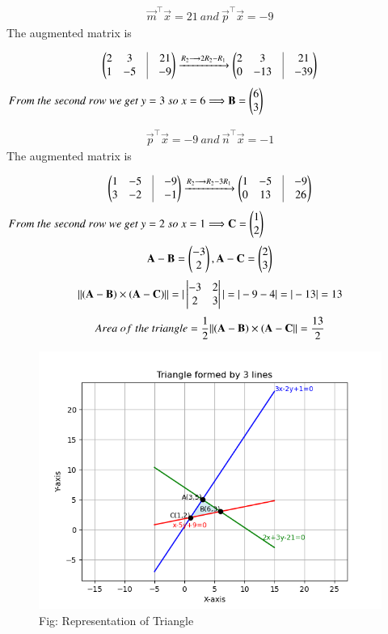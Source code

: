 \documentclass[journal]{IEEEtran}
\begin{document}
\begin{align}
\vec{m}^\top\vec{x} = 21 \ and \ \vec{p}^\top\vec{x} = -9
\end{align}
The augmented matrix is

\begin{align}
\myvec{
2 & 3 &\vrule& 21\\
1 & -5 &\vrule& -9} \xrightarrow{R_2 \longrightarrow 2R_2-R_1}
\myvec{
2 & 3 &\vrule& 21\\
0 & -13 &\vrule& -39}
\end{align}
$ From \ the \ second \ row \ we \ get\ y=3 \ so \ x=6 \Longrightarrow
\vec{B} = \myvec{6\\3} $

\begin{align}
\vec{p}^\top\vec{x} = -9 \ and \ \vec{n}^\top\vec{x} = -1 
\end{align}
The augmented matrix is

\begin{align}
\myvec{
1 & -5 &\vrule& -9\\
3 & -2 &\vrule& -1} \xrightarrow{R_2 \longrightarrow R_2-3R_1}
\myvec{
1 & -5 &\vrule& -9\\
0 & 13 &\vrule& 26}
\end{align}
$ From \ the \ second \ row \ we \ get \ y=2 \ so \ x=1 \Longrightarrow
\vec{C} = \myvec{1\\2} $
\begin{align}
\mathbf{A}-\mathbf{B} = \begin{pmatrix}-3\\2\end{pmatrix} , \mathbf{A}-\mathbf{C} = \begin{pmatrix}2\\3\end{pmatrix}   
\end{align}
\begin{align}
\left\lVert(\mathbf{A}-\mathbf{B})\times(\mathbf{A}-\mathbf{C})\right\rVert = |\begin{vmatrix}-3 & 2 \\
2 & 3\end{vmatrix} | = |-9-4| =|-13| = 13
\end{align}
\begin{align}
Area \ of \ the \ triangle = \frac{1}{2}{\left\lVert(\mathbf{A}-\mathbf{B})\times(\mathbf{A}-\mathbf{C}\right\rVert}
                            =\frac{13}{2}
\end{align}

\begin{figure}[h!]
\centering
\includegraphics[width=0.9\columnwidth]{figs/fig8.png} 
\caption*{Fig: Representation of Triangle}
\label{Fig8}
\end{figure}
\end{document}

